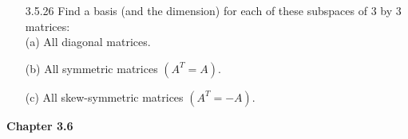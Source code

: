 \documentclass[10pt,twoside,reqno]{article}
\begin{document}
\begin{enumerate}
(d) The columns of a matrix are a basis for the column space.\\
\vspace{3mm} 



\item[3.5.26]  Find a basis (and the dimension) for each of these subspaces of $3$ by $3$ matrices:\\
(a) All diagonal matrices.\\
\vspace{3mm}



(b) All symmetric matrices $(A^T = A)$.\\
\vspace{3mm}



(c) All skew-symmetric matrices $(A^T = -A)$.\\
\vspace{3mm}



\end{enumerate}
\vspace{5mm}
\textbf{Chapter 3.6}
\end{document}
